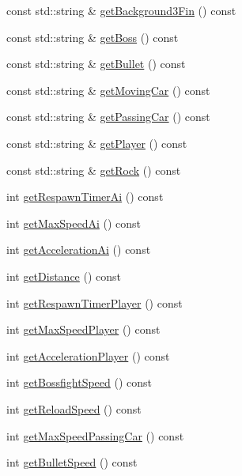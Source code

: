 \begin{DoxyCompactItemize}
const std\+::string \& \hyperlink{classConfigData_aedb142fd1f37b67f0c6136ce0d7f2399}{get\+Background3\+Fin} () const
\item 
const std\+::string \& \hyperlink{classConfigData_a241de31080d870efdde3046d7d9a96b8}{get\+Boss} () const
\item 
const std\+::string \& \hyperlink{classConfigData_a087b7790faec74ef110bd2d810338858}{get\+Bullet} () const
\item 
const std\+::string \& \hyperlink{classConfigData_a79e097cdf1cc394818bb399cc4662176}{get\+Moving\+Car} () const
\item 
const std\+::string \& \hyperlink{classConfigData_a5bc69646f744c91350126a83fe3a8199}{get\+Passing\+Car} () const
\item 
const std\+::string \& \hyperlink{classConfigData_a457424b879afddb0c95273e5ac16badd}{get\+Player} () const
\item 
const std\+::string \& \hyperlink{classConfigData_a9990a42f4759f46479488e1fb912f7b6}{get\+Rock} () const
\item 
int \hyperlink{classConfigData_a6ddf5ff9a004d3b236622e900a652922}{get\+Respawn\+Timer\+Ai} () const
\item 
int \hyperlink{classConfigData_ad9c86352ac8cabb3817eadf52dee0605}{get\+Max\+Speed\+Ai} () const
\item 
int \hyperlink{classConfigData_a8ac967cae90e657e68fbd0d1e163f0ec}{get\+Acceleration\+Ai} () const
\item 
int \hyperlink{classConfigData_ad815c66b9580b9a8bc4eda6ce2cb0e80}{get\+Distance} () const
\item 
int \hyperlink{classConfigData_a115ef1483345c4b89e9984f370dabbcc}{get\+Respawn\+Timer\+Player} () const
\item 
int \hyperlink{classConfigData_ab791ddf310f5dd0f0ed12752dcae18bc}{get\+Max\+Speed\+Player} () const
\item 
int \hyperlink{classConfigData_a7889ad0ddf98c026ef9996a8d09f7337}{get\+Acceleration\+Player} () const
\item 
int \hyperlink{classConfigData_ae74cc34be85fd4265e491c2717ab9638}{get\+Bossfight\+Speed} () const
\item 
int \hyperlink{classConfigData_a3081c0e98b204b3f05fb06c98f7d216e}{get\+Reload\+Speed} () const
\item 
int \hyperlink{classConfigData_acc83f639f36dd93dee1f4bf2cf3cb374}{get\+Max\+Speed\+Passing\+Car} () const
\item 
int \hyperlink{classConfigData_a0251ca808c712d27def8a6d164934a30}{get\+Bullet\+Speed} () const

\end{DoxyCompactItemize}
